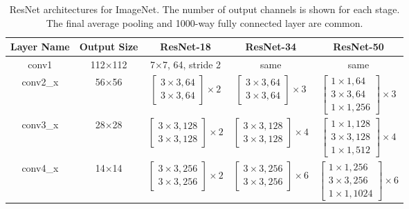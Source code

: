 \documentclass[11pt,a4paper]{article}
\begin{document}
\begin{table}[ht]
\centering
\caption{ResNet architectures for ImageNet. The number of output channels is shown for each stage. The final average pooling and 1000-way fully connected layer are common.}
\label{tab:arch}
\begin{tabular}{c|c|c|c|c}
\toprule
Layer Name & Output Size & ResNet-18 & ResNet-34 & ResNet-50 \\
\midrule
conv1 & 112×112 & 7×7, 64, stride 2 & same & same \\
conv2\_x & 56×56 & $\begin{bmatrix} 3\times3, 64 \\ 3\times3, 64 \end{bmatrix} \times 2$ & $\begin{bmatrix} 3\times3, 64 \\ 3\times3, 64 \end{bmatrix} \times 3$ & $\begin{bmatrix} 1\times1, 64 \\ 3\times3, 64 \\ 1\times1, 256 \end{bmatrix} \times 3$ \\
conv3\_x & 28×28 & $\begin{bmatrix} 3\times3, 128 \\ 3\times3, 128 \end{bmatrix} \times 2$ & $\begin{bmatrix} 3\times3, 128 \\ 3\times3, 128 \end{bmatrix} \times 4$ & $\begin{bmatrix} 1\times1, 128 \\ 3\times3, 128 \\ 1\times1, 512 \end{bmatrix} \times 4$ \\
conv4\_x & 14×14 & $\begin{bmatrix} 3\times3, 256 \\ 3\times3, 256 \end{bmatrix} \times 2$ & $\begin{bmatrix} 3\times3, 256 \\ 3\times3, 256 \end{bmatrix} \times 6$ & $\begin{bmatrix} 1\times1, 256 \\ 3\times3, 256 \\ 1\times1, 1024 \end{bmatrix} \times 6$ \\

\end{tabular}
\end{table}
\end{document}
